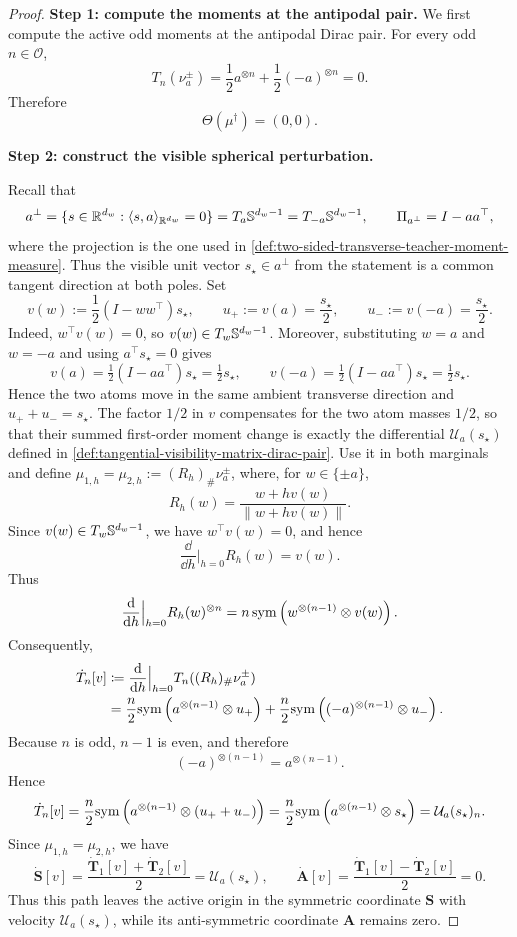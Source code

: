 \begin{proof}
\noindent\textbf{Step 1: compute the moments at the antipodal pair.}
We first compute the active odd moments at the antipodal Dirac pair.  For
every odd \(n\in\mathcal O\),
\[
    T_n(\nu_a^\pm)
    =
    \frac12 a^{\otimes n}
    +
    \frac12(-a)^{\otimes n}
    =
    0.
\]
Therefore
\[
    \Theta(\mu^\dagger)=(0,0).
\]


\par\noindent\textbf{Step 2: construct the visible spherical perturbation.}

Recall that
\[
 a^\perp
 =\{s\in\mathbb R^{d_w}:\langle s,a\rangle_{\mathbb R^{d_w}}=0\}
 =T_a\mathbb{S}^{d_w-1}=T_{-a}\mathbb{S}^{d_w-1},
 \qquad
 \Pi_{a^\perp}=I-aa^\top,
\]
where the projection is the one used in
\cref{def:two-sided-transverse-teacher-moment-measure}.  Thus the visible
unit vector \(s_\star\in a^\perp\) from the statement is a common tangent
direction at both poles.  Set
\begin{equation}
\label{eq:mf-visible-tangent-field}
 v(w):=\frac12(I-ww^\top)s_\star,\qquad
 u_+:=v(a)=\frac{s_\star}{2},\qquad
 u_-:=v(-a)=\frac{s_\star}{2}.
\end{equation}
Indeed, \(w^\top v(w)=0\), so \(v(w)\in T_w\mathbb{S}^{d_w-1}\).
Moreover, substituting \(w=a\) and \(w=-a\) and using
\(a^\top s_\star=0\) gives
\[
 v(a)=\tfrac12(I-aa^\top)s_\star=\tfrac12s_\star,
 \qquad
 v(-a)=\tfrac12(I-aa^\top)s_\star=\tfrac12s_\star.
\]
Hence the two atoms move in the same ambient transverse direction and
\(u_++u_-=s_\star\).  The factor \(1/2\) in \(v\) compensates for the
two atom masses \(1/2\), so that their summed first-order moment change is
exactly the differential \(\mathcal U_a(s_\star)\) defined in
\cref{def:tangential-visibility-matrix-dirac-pair}.
Use it in both marginals and define
\(\mu_{1,h}=\mu_{2,h}:=(R_h)_\#\nu_a^\pm\), where, for
\(w\in\{\pm a\}\),
\[
    R_h(w)=\frac{w+h v(w)}{\|w+h v(w)\|}.
\]
Since \(v(w)\in T_w\mathbb{S}^{d_w-1}\), we have \(w^\top v(w)=0\), and hence
\[
    \frac{\dd}{\dd h}\Big|_{h=0}R_h(w)=v(w).
\]
Thus
\[
    \frac{\dd}{\dd h}\Big|_{h=0}R_h(w)^{\otimes n}
    =
    n\,\mathrm{sym}\left({w^{\otimes(n-1)}\otimes v(w)}\right).
\]
Consequently,
\begin{align}
    \dot T_n[v]
    &\coloneq
    \frac{\dd}{\dd h}\Big|_{h=0}T_n((R_h)_\#\nu_a^\pm)
    \\
    &=
    \frac n2
    \mathrm{sym}\left({a^{\otimes(n-1)}\otimes u_+}\right)
    +
    \frac n2
    \mathrm{sym}\left({(-a)^{\otimes(n-1)}\otimes u_-}\right).
\end{align}
Because \(n\) is odd, \(n-1\) is even, and therefore
\[
    (-a)^{\otimes(n-1)}=a^{\otimes(n-1)}.
\]
Hence
\[
    \dot T_n[v]
    =
    \frac n2
    \mathrm{sym}\left({a^{\otimes(n-1)}\otimes(u_++u_-)}\right)
    =
    \frac n2
    \mathrm{sym}\left({a^{\otimes(n-1)}\otimes s_\star}\right)
    =
    \mathcal U_a(s_\star)_n.
\]
Since \(\mu_{1,h}=\mu_{2,h}\), we have
\[
    \dot{\mathbf S}[v]
    =
    \frac{\dot{\mathbf T}_1[v]+\dot{\mathbf T}_2[v]}{2}
    =
    \mathcal U_a(s_\star),
    \qquad
    \dot{\mathbf A}[v]
    =
    \frac{\dot{\mathbf T}_1[v]-\dot{\mathbf T}_2[v]}{2}
    =
    0.
\]
Thus this path leaves the active origin in the symmetric coordinate
\(\mathbf S\) with velocity \(\mathcal U_a(s_\star)\), while its
anti-symmetric coordinate \(\mathbf A\) remains zero.



\end{proof}
